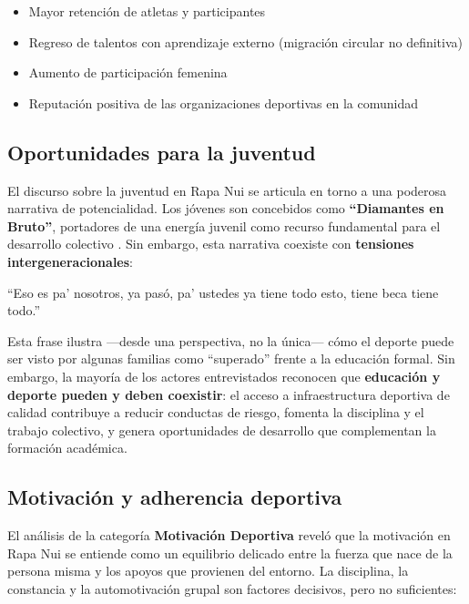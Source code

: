 \documentclass[12pt, a4paper]{article}
\begin{document}
\begin{itemize}[leftmargin=*, itemsep=3pt]
  \item Mayor retención de atletas y participantes
  \item Regreso de talentos con aprendizaje externo (migración circular no definitiva)
  \item Aumento de participación femenina
  \item Reputación positiva de las organizaciones deportivas en la comunidad
\end{itemize}

\subsection{Oportunidades para la juventud}

El discurso sobre la juventud en Rapa Nui se articula en torno a una poderosa
narrativa de potencialidad. Los jóvenes son concebidos como \textbf{``Diamantes en
Bruto''}, portadores de una energía juvenil como recurso fundamental para el
desarrollo colectivo \citep{ortega2026}. Sin embargo, esta narrativa coexiste con
\textbf{tensiones intergeneracionales}:

\begin{citaetno}
``Eso es pa' nosotros, ya pasó, pa' ustedes ya tiene todo esto, tiene beca tiene todo.''\\[4pt]
\end{citaetno}

Esta frase ilustra ---desde una perspectiva, no la única--- cómo el deporte puede
ser visto por algunas familias como ``superado'' frente a la educación formal. Sin
embargo, la mayoría de los actores entrevistados reconocen que \textbf{educación y
deporte pueden y deben coexistir}: el acceso a infraestructura deportiva de calidad
contribuye a reducir conductas de riesgo, fomenta la disciplina y el trabajo colectivo,
y genera oportunidades de desarrollo que complementan la formación académica.

\subsection{Motivación y adherencia deportiva}

El análisis de la categoría \textbf{Motivación Deportiva} reveló que la motivación
en Rapa Nui se entiende como un equilibrio delicado entre la fuerza que nace de la
persona misma y los apoyos que provienen del entorno. La disciplina, la constancia
y la automotivación grupal son factores decisivos, pero no suficientes:
\end{document}
